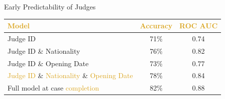 \begin{frame}{Early Predictability of Judges}
    \begin{table}[h!]
        \small
        \begin{center}
          \begin{tabular}{lcc}
            
            \textcolor{goldenrod}{\textbf{Model}} & \textcolor{goldenrod}{\textbf{Accuracy}}  & \textcolor{goldenrod}{\textbf{ROC AUC}} \\
            \hline
            Judge ID & 71\% & 0.74 \\
            Judge ID \& Nationality & 76\% & 0.82 \\
            Judge ID \& Opening Date & 73\% & 0.77 \\
            \textcolor{goldenrod}{Judge ID} \& \textcolor{goldenrod}{Nationality} \& \textcolor{goldenrod}{Opening Date} & 78\% & 0.84 \\
            \hline
            Full model at case \textcolor{goldenrod}{completion} & 82\% & 0.88
          \end{tabular}
        \end{center}
      \end{table}
\end{frame}

